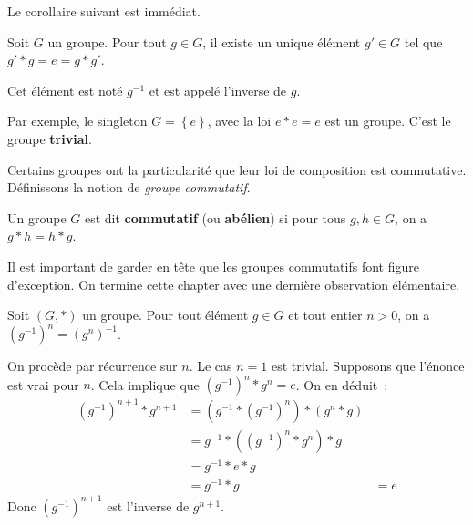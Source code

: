 \documentclass[french]{book}
\begin{document}
Le corollaire suivant est immédiat.
\begin{corol}
  Soit $G$ un groupe. Pour tout $g \in G$, il existe un unique élément $g' \in G$ tel que $g' * g = e = g * g'$.
\end{corol}
Cet élément est noté $g^{-1}$ et est appelé l'inverse de $g$.
\par Par exemple, le singleton $G = \left\{ e \right\}$, avec la loi $e * e = e$ est un groupe. C'est le groupe \textbf{trivial}.
\par Certains groupes ont la particularité que leur loi de composition est commutative. Définissons la notion de \textit{groupe commutatif}.
\begin{definition}
  Un groupe $G$ est dit \textbf{commutatif} (ou \textbf{abélien}) si pour tous $g, h \in G$, on a $g * h = h * g$.
\end{definition}
Il est important de garder en tête que les groupes commutatifs font figure
d’exception. On termine cette chapter avec une dernière observation élémentaire.

\begin{lemme}
  Soit $(G, *)$ un groupe. Pour tout élément $g \in G$ et tout entier $n > 0$, on a $(g^{-1})^n = (g^n)^{-1}$.
  \tcblower
  \begin{preuve}
    On procède par récurrence sur $n$. Le cas $n=1$ est trivial. Supposons que l'énonce est vrai pour $n$. Cela implique que $(g^{-1})^n * g^n = e$. On en déduit :
    \begin{align*}
      (g^{-1})^{n+1} * g^{n+1} &= \left( g^{-1} * (g^{-1})^n \right) * (g^n * g) \\
                               &= g^{-1} * \left( (g^{-1})^n * g^n \right) * g \\
                               &= g^{-1} * e * g \\
                               &= g^{-1} * g
                               &= e
    \end{align*}
    Donc $(g^{-1})^{n+1}$ est l'inverse de $g^{n+1}$.
  \end{preuve}
\end{lemme}
\end{document}
